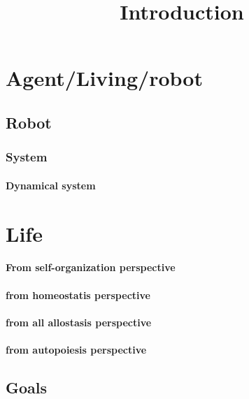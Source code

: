 \documentclass[a4paper]{article}
\title{Introduction}
\date{}
\begin{document}
    \maketitle
    
    
    \section{Agent/Living/robot}
        
        \subsection{Robot}
            
            \subsubsection{System}
                
                \paragraph{Dynamical system}
    
    
    \section{Life}
        
        \paragraph{From self-organization perspective}
        
        \paragraph{from homeostatis perspective}
        
        \paragraph{from all allostasis perspective}
        
        \paragraph{from autopoiesis perspective}
    
    \subsection{Goals}
    
\end{document}
